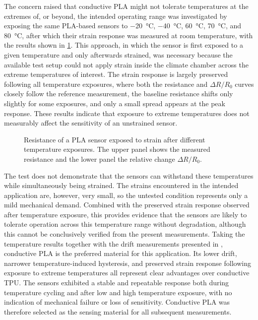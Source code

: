 The concern raised that conductive PLA might not tolerate temperatures at the extremes of, or beyond, the intended operating range was investigated by exposing the same PLA-based sensors to \SI{-20}{\celsius}, \SI{-40}{\celsius}, \SI{60}{\celsius}, \SI{70}{\celsius}, and \SI{80}{\celsius}, after which their strain response was measured at room temperature, with the results shown in \cref{fig:PLA_after_temp_limits}. This approach, in which the sensor is first exposed to a given temperature and only afterwards strained, was necessary because the available test setup could not apply strain inside the climate chamber across the extreme temperatures of interest. The strain response is largely preserved following all temperature exposures, where both the resistance and $\Delta R / R_0$ curves closely follow the reference measurement, the baseline resistance shifts only slightly for some exposures, and only a small spread appears at the peak response. These results indicate that exposure to extreme temperatures does not measurably affect the sensitivity of an unstrained sensor.

\begin{figure}[!b]
\centering

    \caption{Resistance of a PLA sensor exposed to strain after different temperature exposures. The upper panel shows the measured resistance and the lower panel the relative change $\Delta R/R_0$.}
    \label{fig:PLA_after_temp_limits}
\end{figure}

The test does not demonstrate that the sensors can withstand these temperatures while simultaneously being strained. The strains encountered in the intended application are, however, very small, so the untested condition represents only a mild mechanical demand. Combined with the preserved strain response observed after temperature exposure, this provides evidence that the sensors are likely to tolerate operation across this temperature range without degradation, although this cannot be conclusively verified from the present measurements.
Taking the temperature results together with the drift measurements presented in , conductive PLA is the preferred material for this application. Its lower drift, narrower temperature-induced hysteresis, and preserved strain response following exposure to extreme temperatures all represent clear advantages over conductive TPU. The sensors exhibited a stable and repeatable response both during temperature cycling and after low and high temperature exposure, with no indication of mechanical failure or loss of sensitivity. Conductive PLA was therefore selected as the sensing material for all subsequent measurements.